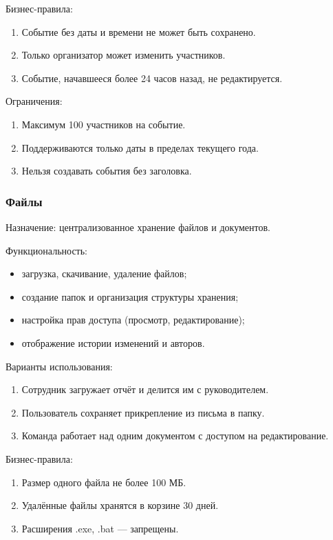 Бизнес-правила:
\begin{enumerate}
  \item Событие без даты и времени не может быть сохранено.
  \item Только организатор может изменить участников.
  \item Событие, начавшееся более 24 часов назад, не редактируется.
\end{enumerate}

Ограничения:
\begin{enumerate}
  \item Максимум 100 участников на событие.
  \item Поддерживаются только даты в пределах текущего года.
  \item Нельзя создавать события без заголовка.
\end{enumerate}

\subsubsection{Файлы}

Назначение: централизованное хранение файлов и документов.

Функциональность:
\begin{itemize}
  \item загрузка, скачивание, удаление файлов;
  \item создание папок и организация структуры хранения;
  \item настройка прав доступа (просмотр, редактирование);
  \item отображение истории изменений и авторов.
\end{itemize}

Варианты использования:
\begin{enumerate}
  \item Сотрудник загружает отчёт и делится им с руководителем.
  \item Пользователь сохраняет прикрепление из письма в папку.
  \item Команда работает над одним документом с доступом на редактирование.
\end{enumerate}

Бизнес-правила:
\begin{enumerate}
  \item Размер одного файла не более 100 МБ.
  \item Удалённые файлы хранятся в корзине 30 дней.
  \item Расширения .exe, .bat — запрещены.
\end{enumerate}

